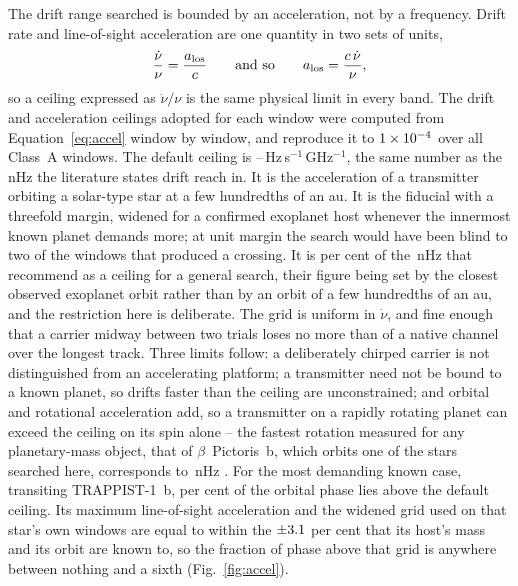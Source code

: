 The drift range searched is bounded by an acceleration, not by a
frequency. Drift rate and line-of-sight acceleration are one quantity in
two sets of units,
%
\begin{equation}
\frac{\dot\nu}{\nu}=\frac{a_{\rm los}}{c}
\qquad\text{and so}\qquad
a_{\rm los}=\frac{c\,\dot\nu}{\nu},
\label{eq:accel}
\end{equation}
%
so a ceiling expressed as $\dot\nu/\nu$ is the same physical limit in
every band. The drift and acceleration ceilings adopted for each window
were computed from Equation~\ref{eq:accel} window by window, and
reproduce it to $1\times10^{-4}$ over all \DriftRelNWin{} Class~A windows.
The default ceiling is
\DriftCeilLo--\DriftCeilHi\,Hz\,s$^{-1}$\,GHz$^{-1}$, the same number as
the nHz the literature states drift reach in. It is the acceleration of a
transmitter orbiting a solar-type star at a few hundredths of an au. It is the \citet{Mason2025} fiducial with a
threefold margin, widened for a confirmed exoplanet host whenever the
innermost known planet demands more; at unit margin the search would have
been blind to two of the windows that produced a crossing. It is
\AccelSheikhPct{} per cent of the \AccelSheikhNHz\,nHz that
\citet{Sheikh2019} recommend as a ceiling for a general search, their figure
being set by the closest observed exoplanet orbit rather than by an orbit of
a few hundredths of an au, and the restriction here is deliberate. The grid is uniform
in $\dot\nu$, and fine enough
that a carrier midway between two trials loses no more than
\DriftGridFineHalf{} of a native channel over the longest track. Three
limits follow: a deliberately chirped carrier is not distinguished from an
accelerating platform; a transmitter need not be bound to a known planet,
so drifts faster than the ceiling are unconstrained; and orbital and
rotational acceleration add, so a transmitter on a rapidly rotating planet
can exceed the ceiling on its spin alone -- the fastest rotation measured for
any planetary-mass object, that of $\beta$~Pictoris~b, which orbits one of the
stars searched here, corresponds to \AccelBpicRotNHz\,nHz
\citep{Sheikh2019}. For the most demanding known case,
transiting TRAPPIST-1~b, \TrapPhaseHi{} per cent of the orbital phase lies
above the default ceiling. Its maximum line-of-sight acceleration and the
widened grid used on that star's own windows are equal to within the
$\pm3.1$ per cent that its host's mass and its orbit are known to, so
the fraction of phase above that grid is anywhere between nothing and a sixth
(Fig.~\ref{fig:accel}).

